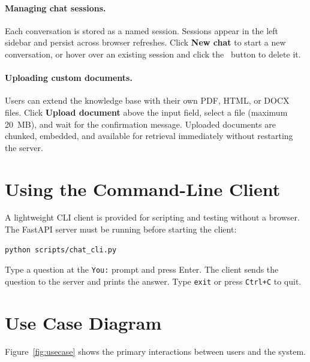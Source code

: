 \paragraph{Managing chat sessions.}
Each conversation is stored as a named session. Sessions appear in the left sidebar
and persist across browser refreshes. Click \textbf{New chat} to start a new
conversation, or hover over an existing session and click the \texttimes\ button
to delete it.

\paragraph{Uploading custom documents.}
Users can extend the knowledge base with their own PDF, HTML, or DOCX files.
Click \textbf{Upload document} above the input field, select a file (maximum
20~MB), and wait for the confirmation message. Uploaded documents are chunked,
embedded, and available for retrieval immediately without restarting the server.

\section{Using the Command-Line Client}
\label{sec:user-cli}

A lightweight CLI client is provided for scripting and testing without a browser.
The FastAPI server must be running before starting the client:

\begin{lstlisting}[language=bash]
python scripts/chat_cli.py
\end{lstlisting}

Type a question at the \texttt{You:} prompt and press Enter. The client sends the
question to the server and prints the answer. Type \texttt{exit} or press
\texttt{Ctrl+C} to quit.

\section{Use Case Diagram}
\label{sec:user-usecase}

Figure~\ref{fig:usecase} shows the primary interactions between users and the system.

